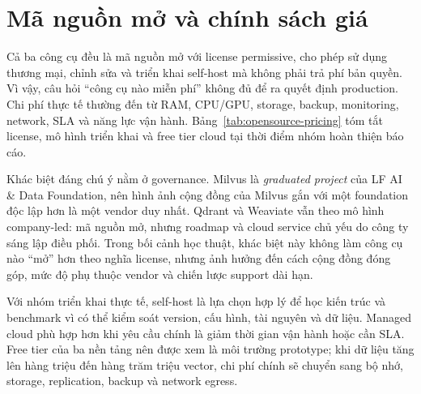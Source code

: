 \section{Mã nguồn mở và chính sách giá}
\label{sec:opensource}

Cả ba công cụ đều là mã nguồn mở với license permissive, cho phép sử dụng thương mại, chỉnh sửa và triển khai self-host mà không phải trả phí bản quyền. Vì vậy, câu hỏi ``công cụ nào miễn phí'' không đủ để ra quyết định production. Chi phí thực tế thường đến từ RAM, CPU/GPU, storage, backup, monitoring, network, SLA và năng lực vận hành. Bảng~\ref{tab:opensource-pricing} tóm tắt license, mô hình triển khai và free tier cloud tại thời điểm nhóm hoàn thiện báo cáo.

\begin{table}[H]
\centering
\caption{So sánh license, self-host và chính sách cloud/free tier.}
\label{tab:opensource-pricing}
\end{table}

Khác biệt đáng chú ý nằm ở governance. Milvus là \textit{graduated project} của LF AI \& Data Foundation, nên hình ảnh cộng đồng của Milvus gắn với một foundation độc lập hơn là một vendor duy nhất. Qdrant và Weaviate vẫn theo mô hình company-led: mã nguồn mở, nhưng roadmap và cloud service chủ yếu do công ty sáng lập điều phối. Trong bối cảnh học thuật, khác biệt này không làm công cụ nào ``mở'' hơn theo nghĩa license, nhưng ảnh hưởng đến cách cộng đồng đóng góp, mức độ phụ thuộc vendor và chiến lược support dài hạn.

Với nhóm triển khai thực tế, self-host là lựa chọn hợp lý để học kiến trúc và benchmark vì có thể kiểm soát version, cấu hình, tài nguyên và dữ liệu. Managed cloud phù hợp hơn khi yêu cầu chính là giảm thời gian vận hành hoặc cần SLA. Free tier của ba nền tảng nên được xem là môi trường prototype; khi dữ liệu tăng lên hàng triệu đến hàng trăm triệu vector, chi phí chính sẽ chuyển sang bộ nhớ, storage, replication, backup và network egress.
